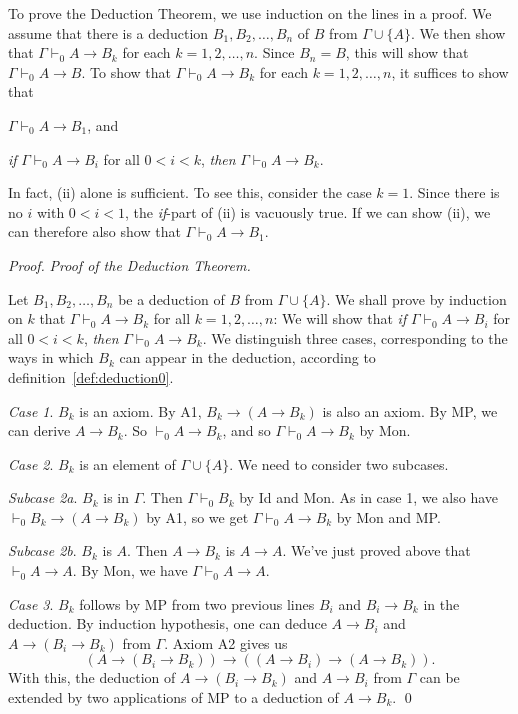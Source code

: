 To prove the Deduction Theorem,
we use induction on the lines in a proof.
We assume that
there is a deduction $B_{1}, B_{2}, \ldots, B_{n}$ of $B$ from $\Gamma \cup \{ A \}$.
We then show that $\Gamma \vdash_{0} A \to B_{k}$ for each $k = 1, 2, \ldots, n$.
Since $B_{n} = B$,
this will show that $\Gamma \vdash_{0} A \to B$.
To show that $\Gamma \vdash_{0} A \to B_{k}$ for each $k = 1, 2, \ldots, n$,
it suffices to show that
\begin{cenumerate}
  \item[(i)] $\Gamma \vdash_{0} A \to B_{1}$, and
  \item[(ii)] \emph{if} $\Gamma \vdash_{0} A \to B_{i}$ for all $0 < i < k$, \emph{then} $\Gamma \vdash_{0} A \to B_{k}$.
\end{cenumerate}
In fact,
(ii) alone is sufficient.
To see this,
consider the case $k = 1$.
Since there is no $i$ with $0 < i < 1$,
the \emph{if}-part of (ii) is vacuously true.
If we can show (ii),
we can therefore also show that $\Gamma \vdash_{0} A \to B_{1}$.

\begin{proof}
  \emph{Proof of the Deduction Theorem.}

  Let $B_{1}, B_{2}, \ldots, B_{n}$ be a deduction of $B$ from $\Gamma \cup \{ A \}$.
  We shall prove by induction on $k$ that
  $\Gamma \vdash_{0} A \to B_{k}$ for all $k = 1, 2, \ldots, n$:
  We will show that
  \emph{if} $\Gamma \vdash_{0} A \to B_{i}$ for all $0 < i < k$,
  \emph{then} $\Gamma \vdash_{0} A \to B_{k}$.
  We distinguish three cases,
  corresponding to the ways in which $B_{k}$ can appear in the deduction,
  according to definition~\ref{def:deduction0}.

  \emph{Case 1}.
  $B_{k}$ is an axiom.
  By A1, $B_{k} \to (A \to B_{k})$ is also an axiom.
  By MP,
  we can derive $A \to B_{k}$.
  So $\vdash_{0} A \to B_{k}$,
  and so $\Gamma \vdash_{0} A \to B_{k}$ by Mon.

  \emph{Case 2}.
  $B_{k}$ is an element of $\Gamma \cup \{ A \}$.
  We need to consider two subcases.

  \emph{Subcase 2a}.
  $B_{k}$ is in $\Gamma$.
  Then $\Gamma \vdash_{0} B_{k}$ by Id and Mon.
  As in case 1,
  we also have $\vdash_{0} B_{k} \to (A \to B_{k})$ by A1,
  so we get $\Gamma \vdash_{0} A \to B_{k}$ by Mon and MP.

  \emph{Subcase 2b}.
  $B_{k}$ is $A$.
  Then $A \to B_{k}$ is $A \to A$.
  We've just proved above that $\vdash_{0} A \to A$.
  By Mon, we have $\Gamma \vdash_{0} A \to A$.

  \emph{Case 3}.
  $B_{k}$ follows by MP from two previous lines $B_{i}$ and $B_{i} \to B_{k}$ in the deduction.
  By induction hypothesis,
  one can deduce $A \to B_{i}$ and $A \to (B_{i} \to B_{k})$ from $\Gamma$.
  Axiom A2 gives us
  \[
    (A \to (B_{i} \to B_{k})) \to ((A \to B_{i}) \to (A \to B_{k})).
  \]
  With this,
  the deduction of $A \to (B_{i} \to B_{k})$ and $A \to B_{i}$  from $\Gamma$
  can be extended by two applications of MP to a deduction of $A \to B_{k}$.
  \qed
\end{proof}

